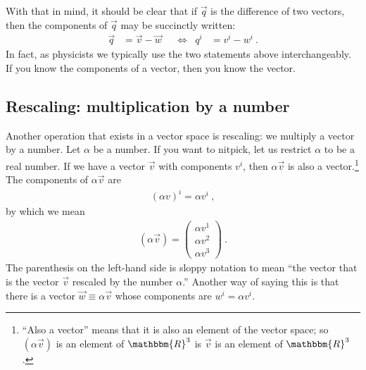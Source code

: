 \documentclass[12pt]{article}
\begin{document}
With that in mind, it should be clear that if $\vec{q}$ is the difference of two vectors, then the components of $\vec{q}$ may be succinctly written:
\begin{align}
\vec{q} &= \vec{v}-\vec{w}    
&
&\Leftrightarrow
&
q^i &= v^i - w^i \ .
\end{align}
In fact, as physicists we typically use the two statements above interchangeably. If you know the components of a vector, then you know the vector.



\subsection{Rescaling: multiplication by a number}

Another operation that exists in a vector space is rescaling: we multiply a vector by a number. 
Let $\alpha$ be a number. If you want to nitpick, let us restrict $\alpha$ to be a real number. If we have a vector $\vec{v}$ with components $v^i$, then $\alpha \vec{v}$ is also a vector.\footnote{``Also a vector'' means that it is also an element of the vector space; so $(\alpha\vec{v})$ is an element of $\mathbbm{R}^3$ is $\vec{v}$ is an element of $\mathbbm{R}^3$. } The components of $\alpha \vec{v}$ are
\begin{align}
    (\alpha v)^i = \alpha v^i \ ,
\end{align}
by which we mean
\begin{align}
    (\alpha\vec{v})
    =
    \begin{pmatrix}
        \alpha v^1 \\
        \alpha v^2 \\
        \alpha v^3 
    \end{pmatrix} \ .
\end{align}
The parenthesis on the left-hand side is sloppy notation to mean ``the vector that is the vector $\vec{v}$ rescaled by the number  $\alpha$.'' Another way of saying this is that there is a vector $\vec{w}\equiv \alpha\vec{v}$ whose components are $w^i = \alpha v^i$.
\end{document}

